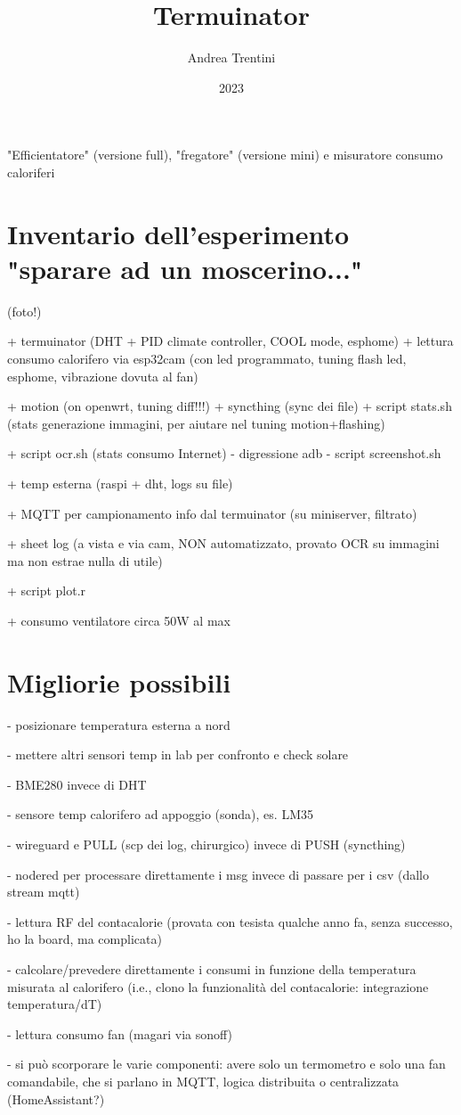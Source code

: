 \documentclass[a4paper,12pt]{article}
\title{Termuinator}
\author{Andrea Trentini}
\date{2023}
\begin{document}
\maketitle



"Efficientatore" (versione full), "fregatore" (versione mini) e misuratore consumo caloriferi


\section{Inventario dell'esperimento "sparare ad un moscerino..."}

(foto!)

+ termuinator (DHT + PID climate controller, COOL mode, esphome)
+ lettura consumo calorifero via esp32cam (con led programmato, tuning flash led, esphome, vibrazione dovuta al fan)

+ motion (on openwrt, tuning diff!!!)
+ syncthing (sync dei file)
+ script stats.sh (stats generazione immagini, per aiutare nel tuning motion+flashing)

+ script ocr.sh (stats consumo Internet)
- digressione adb
- script screenshot.sh

+ temp esterna (raspi + dht, logs su file)

+ MQTT per campionamento info dal termuinator (su miniserver, filtrato)

+ sheet log (a vista e via cam, NON automatizzato, provato OCR su immagini ma non estrae nulla di utile)

+ script plot.r

+ consumo ventilatore circa 50W al max


\section{Migliorie possibili}

- posizionare temperatura esterna a nord

- mettere altri sensori temp in lab per confronto e check solare

- BME280 invece di DHT

- sensore temp calorifero ad appoggio (sonda), es. LM35

- wireguard e PULL (scp dei log, chirurgico) invece di PUSH (syncthing)

- nodered per processare direttamente i msg invece di passare per i csv (dallo stream mqtt)

- lettura RF del contacalorie (provata con tesista qualche anno fa, senza successo, ho la board, ma complicata)

- calcolare/prevedere direttamente i consumi in funzione della temperatura misurata al calorifero (i.e., clono la funzionalità del contacalorie: integrazione temperatura/dT)

- lettura consumo fan (magari via sonoff)

- si può scorporare le varie componenti: avere solo un termometro e solo una fan comandabile, che si parlano in MQTT, logica distribuita o centralizzata (HomeAssistant?)
\end{document}
